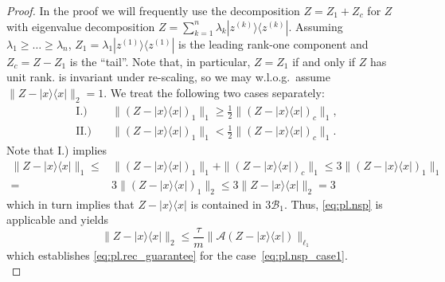 \begin{proof}
  In the proof we will frequently use the decomposition $ Z =  Z_1+ Z_c$ for $ Z$ with eigenvalue decomposition $ Z = \sum_{k=1}^n \lambda_k | z^{(k)} \rangle \! \langle  z^{(k)}|$.
  Assuming $\lambda_1 \ge \ldots \ge \lambda_n$, $Z_1 = \lambda_1 | z^{(1)} \rangle \! \langle  z^{(1)}|$ is the leading rank-one component and $ Z_c =  Z- Z_1$ is the ``tail''.
  Note that, in particular, $ Z =  Z_1$ if and only if $ Z$ has unit rank.
   is invariant under re-scaling, so we may w.l.o.g.\ assume $\|  Z-|{x} \rangle \! \langle {x}|\|_2=1$.
  We treat the following two cases separately:
  \begin{align}
    \mathrm{I.)} \quad& \| ( Z-|{x} \rangle \! \langle {x}|)_1 \|_1 \geq \frac{1}{2} \| ( Z-|{x} \rangle \! \langle {x}|)_c \|_1, \label{eq:pl.nsp_case1} \\
    \mathrm{II.)} \quad & \| ( Z-|{x} \rangle \! \langle {x}|)_1 \|_1 < \frac{1}{2} \| ( Z-|{x} \rangle \! \langle {x}|)_c \|_1. \label{eq:pl.nsp_case2}
  \end{align}
  Note that I.) implies
  \begin{align}
    \|  Z-|{x} \rangle \! \langle {x}| \|_1 \leq &\| ( Z-|{x} \rangle \! \langle {x}|)_1 \|_1 + \| ( Z-|{x} \rangle \! \langle {x}|)_c \|_1 \leq 3 \| ( Z-|{x} \rangle \! \langle {x}|)_1 \|_1 \\
    = & 3 \| ( Z-|{x} \rangle \! \langle {x}|)_1 \|_2 \leq 3 \|  Z- |{x} \rangle \! \langle {x}| \|_2 = 3
  \end{align}
  which in turn implies that $ Z-| {x} \rangle \! \langle {x}|$ is contained in $3 \mathcal{B}_1$.
  Thus, \eqref{eq:pl.nsp} is applicable and yields
  \[
  \|  Z - |{x} \rangle \! \langle {x}| \|_2 \leq  \frac{\tau}{m} \| \mathcal{A}( Z-|{x} \rangle \! \langle {x}|) \|_{\ell_1}
  \]
  which establishes \cref{eq:pl.rec_guarantee} for the case~\eqref{eq:pl.nsp_case1}.\\




\end{proof}
